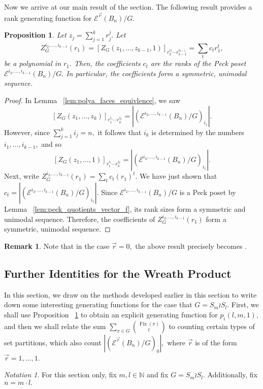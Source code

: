 \documentclass[10 pt]{amsart}
\theoremstyle{plain}
\newtheorem{prop}[thm]{Proposition}
\theoremstyle{definition}
\newtheorem{rem}[thm]{Remark}
\theoremstyle{remark}
\newtheorem{note}[thm]{Notation}
\numberwithin{equation}{section}
\newcommand\ssec{\subsection}
\newcommand\BN{{\mathbb N}}
\renewcommand{\vec}[1]{\overrightarrow{#1}}
\def\Fix{\operatorname{Fix}}
\begin{document}
Now we arrive at our main result of the section. The following result provides a rank generating function for $\mathcal E^{\vec r}(B_n)/G.$

\begin{prop}
\label{prop:rank_gen_fn}
Let $z_j = \sum_{j = 1}^k r_j^j.$ Let $$Z_G^{i_2,\ldots,i_{k-1}}(r_1) =[Z_G(z_1,\ldots, z_{k-1},1)]_{r_2^{i_2}\cdots r_{k-1}^{i_{k-1}}}= \sum_{t}^{}c_tr_1^t,$$ be a polynomial in $r_1.$ Then, the coefficients $c_t$  are the ranks of the Peck poset \linebreak $\mathcal E^{i_2,\ldots, i_{k-1}}(B_n)/G.$ In particular, the coefficients form a symmetric, unimodal sequence.
\end{prop}
\begin{proof}
In Lemma ~\ref{lem:polya_faces_equivlence}, we saw $$[Z_G(z_1,\ldots, z_k)]_{r_1^{i_1} \cdots r_k^{i_k}}=|(\mathcal E^{i_2,\ldots, i_{k-1}}(B_n)/G)_{i_1}|.$$
However, since $\sum_{j = 1}^k i_j = n,$ it follows that $i_k$ is determined by the numbers $i_1,\ldots, i_{k-1},$ and so 
$$[Z_G(z_1,\ldots, 1)]_{r_1^{i_1} \cdots r_k^{i_k}}=|(\mathcal E^{i_2,\ldots, i_{k-1}}(B_n)/G)_{i_1}|.$$
Next, write $Z_G^{i_2,\ldots,i_{k-1}}(r_1) = \sum_{t} c_t (r_1)^t.$ We have just shown that $c_t = |(\mathcal E^{i_2,\ldots, i_{k-1}}(B_n)/G)_{i_1}|.$ Since $\mathcal E^{i_2,\ldots, i_{k-1}}(B_n)/G$ is a Peck poset by Lemma ~\ref{lem:peck_quotients_vector_f}, its rank sizes form a symmetric and unimodal sequence. Therefore, the coefficients of $Z_G^{i_2,\ldots,i_{k-1}}(r_1)$ form a symmetric, unimodal sequence.
\end{proof}

\begin{rem}
Note that in the case $\vec r = 0,$ the above result precisely becomes \cite[Corollary 7.16]{algebraic_stanley}.
\end{rem}

\ssec{Further Identities for the Wreath Product}
In this section, we draw on the methods developed earlier in this section to write down some interesting generating functions for the case that $G = S_m \wr S_l.$
First, we shall use Proposition ~\ref{prop:rank_gen_fn} to obtain an explicit generating function for $p_i(l,m,1),$ and then we shall relate the sum $\sum_{\pi \in G} \binom{\Fix(\pi)}{t}$ to counting certain types of set partitions, which also count $|(\mathcal E^{\vec r}(B_n)/G)_0|,$ where $\vec r$ is of the form $\vec r = 1,\ldots, 1$.

\begin{note}
For this section only, fix $m,l \in \BN$ and fix $G = S_m \wr S_l.$ Additionally, fix $n = m \cdot l.$
\end{note}
\end{document}
